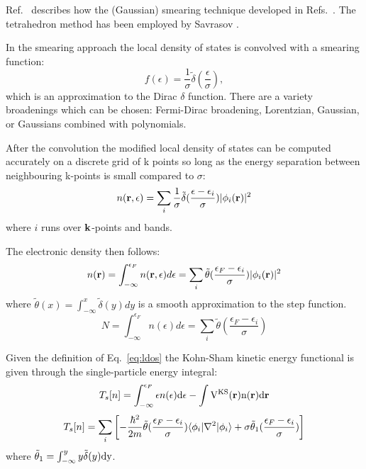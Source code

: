 Ref.~\cite{degironcoli95} describes how the (Gaussian) smearing 
technique developed in Refs.~\cite{fu83, methfessel89}.
The tetrahedron method has been employed by Savrasov \cite{savrasov92}.

In the smearing approach the local density of states is convolved 
with a smearing function:
%
\begin{equation}
f(\epsilon)=\frac{1}{\sigma}\tilde{\delta}(\frac{\epsilon}{\sigma}),
\end{equation}
%
which is an approximation to the Dirac $\delta$ function. There
are a variety broadenings which can be chosen: Fermi-Dirac broadening, 
Lorentzian, Gaussian, or Gaussians combined with polynomials.

After the convolution the modified local density of states can be computed accurately on a discrete
grid of k points so long as the energy separation between neighbouring k-points is 
small compared to $\sigma$:
%
\begin{equation}
\label{eq:ldos}
n({\bf r},\epsilon) = \sum_{i} \frac{1}{\sigma} \tilde{\delta}(\frac{\epsilon-\epsilon_{i}}{\sigma})|\phi_{i}({\bf r})|^{2}
\end{equation}
%
where $i$ runs over ${\bf k}$-points and bands.

The electronic density then follows:
%
\begin{equation}
n({\bf r})=\int_{-\infty}^{\epsilon_{F}}n({\bf r},\epsilon)d\epsilon=\sum_{i}\tilde{\theta}(\frac{\epsilon_{F}-\epsilon_{i}}{\sigma})|\phi_{i}({\bf r})|^{2}
\end{equation}
%
where $\tilde{\theta}(x) = \int_{-\infty}^{x}\tilde{\delta}(y) dy$ is a smooth
approximation to the step function.
%
\begin{equation}
N = \int_{-\infty}^{\epsilon_{F}}n(\epsilon) d\epsilon = \sum_{i} \tilde{\theta}(\frac{\epsilon_{F}- \epsilon_{i}}{\sigma})
\end{equation}
%

Given the definition of Eq.~\ref{eq:ldos} the Kohn-Sham 
kinetic energy functional is given through
the single-particle energy integral:
%
\begin{equation}
T_{s}[n] = \int_{-\infty}^{\epsilon_{F}}\epsilon n(\epsilon)\rm{d}\epsilon-\int V^{KS}({\bf r})n({\bf r})d{\bf r}
\end{equation}
%
\begin{equation}
T_{s}[n] = \sum_{i} \left[ -\frac{\hbar^{2}}{2m} \tilde{\theta}(\frac{\epsilon_{F}-\epsilon_{i}}{\sigma}) \langle\phi_{i}|\nabla^{2}|\phi_{i}\rangle 
+ \sigma\tilde{\theta}_{1}(\frac{\epsilon_{F}-\epsilon_{i}}{\sigma}) \right]
\end{equation}
%
where $\tilde{\theta}_{1}= \int_{-\infty}^{y}y\tilde{\delta}(y)\rm{d}y$.

